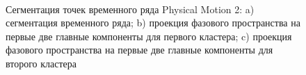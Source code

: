 \begin{figure}[h!t]\center
{}
\\
\caption{Сегментация точек временного ряда Physical Motion 2: 
a) сегментация временного ряда; b) проекция фазового пространства на первые две главные компоненты для первого кластера; c) проекция фазового пространства на первые две главные компоненты для второго кластера}
\label{fig_real_segmentation}
\end{figure}